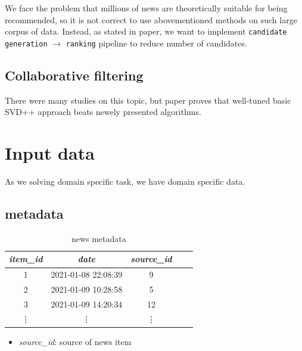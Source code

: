 \documentclass{article}
\begin{document}
    We face the problem that millions of news are theoretically suitable for being recommended, so it is not correct to use abovementioned methods on such large corpus of data. Instead, as stated in \citep{youtube} paper, we want to implement \texttt{candidate generation} $\to$ \texttt{ranking} pipeline to reduce number of candidates.



    \subsection{Collaborative filtering}

    There were many studies on this topic, but paper \citep{evaluation} proves that well-tuned basic SVD++ approach beats newely presented algorithms.



    \section{Input data}
    \label{sec:input}

    As we solving domain specific task, we have domain specific data.

    \subsection*{metadata}

    \begin{table}[h]
        \centering
        \begin{tabular}{ccccc}
            \toprule

            \emph{item\_id} & \emph{date} & \emph{source\_id} \\\midrule

            1 & 2021-01-08 22:08:39 & 9  \\
            2 & 2021-01-09 10:28:58 & 5  \\
            3 & 2021-01-09 14:20:34 & 12 \\
            \vdots & \vdots & \vdots  \\\bottomrule


         \hline
        \end{tabular}

        \caption{news metadata}
        \label{tab:meta}
    \end{table}

    
    \begin{itemize}
        \item \emph{source\_id}: source of news item
    \end{itemize}
\end{document}
